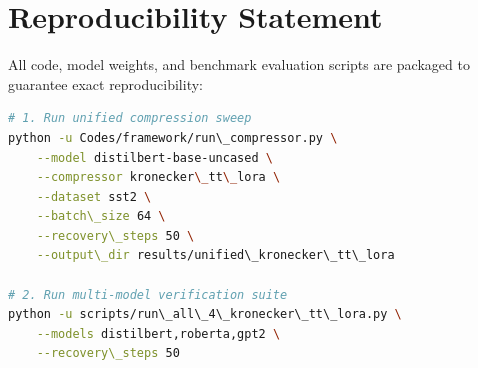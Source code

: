 \section{Reproducibility Statement}
All code, model weights, and benchmark evaluation scripts are packaged to guarantee exact reproducibility:
\begin{lstlisting}[language=bash]
# 1. Run unified compression sweep
python -u Codes/framework/run\_compressor.py \
    --model distilbert-base-uncased \
    --compressor kronecker\_tt\_lora \
    --dataset sst2 \
    --batch\_size 64 \
    --recovery\_steps 50 \
    --output\_dir results/unified\_kronecker\_tt\_lora

# 2. Run multi-model verification suite
python -u scripts/run\_all\_4\_kronecker\_tt\_lora.py \
    --models distilbert,roberta,gpt2 \
    --recovery\_steps 50
\end{lstlisting}
